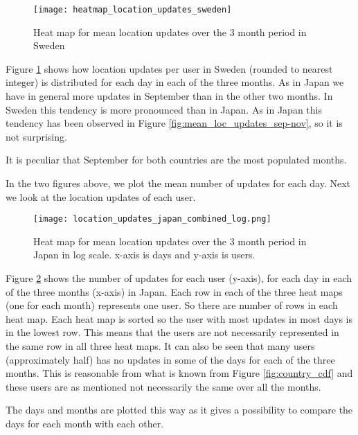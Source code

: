 \begin{figure}[H]
    \hspace*{-1.5cm}
    \centering
    \texttt{[image: heatmap\_location\_updates\_sweden]}
    \caption{Heat map for mean location updates over the 3 month period in Sweden}
    \label{fig:heatmap_swe}
\end{figure}

Figure \ref{fig:heatmap_swe} shows how location updates per user in Sweden (rounded to nearest integer) is distributed for each day in each of the three months. As in Japan we have in general more updates in September than in the other two months. In Sweden this tendency is more pronounced than in Japan. As in Japan this tendency has been observed in Figure \ref{fig:mean_loc_updates_sep-nov}, so it is not surprising.

It is peculiar that September for both countries are the most populated months.

In the two figures above, we plot the mean number of updates for each day. Next we look at the location updates of each user.

\begin{figure}[H]
    \hspace*{-1.5cm}
    \centering
    \texttt{[image: location\_updates\_japan\_combined\_log.png]}
    \caption{Heat map for mean location updates over the 3 month period in Japan in log scale. x-axis is days and y-axis is users.}
    \vspace{-12pt}
    \label{fig:heatmap_japan_combined}
\end{figure}

Figure \ref{fig:heatmap_japan_combined} shows the number of updates for each user (y-axis), for each day in each of the three months (x-axis) in Japan. Each row in each of the three heat maps (one for each month) represents one user. So there are \numberUsersJapan{} number of rows in each heat map.  Each heat map is sorted so the user with most updates in most days is in the lowest row. This means that the users are not necessarily represented in the same row in all three heat maps. It can also be seen that many users (approximately half) has no updates in some of the days for each of the three months. This is reasonable from what is known from Figure \ref{fig:country_cdf} and these users are as mentioned not necessarily the same over all the months. 

The days and months are plotted this way as it gives a possibility to compare the days for each month with each other. 

